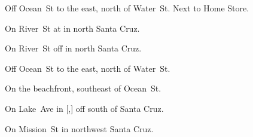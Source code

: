 
\begin{LocationList}

Off Ocean~St to the east, north of Water~St.
Next to Home Store.

On  River~St at  in north Santa Cruz.

On  River~St off  in north Santa Cruz.

Off Ocean~St to the east, north of Water~St.

On the beachfront, southeast of Ocean~St.

On  Lake~Ave in [,] off  south of Santa Cruz.

\Location{\TruckStop \Gas \Rest \Service}
On  Mission~St in northwest Santa Cruz.

\end{LocationList}
